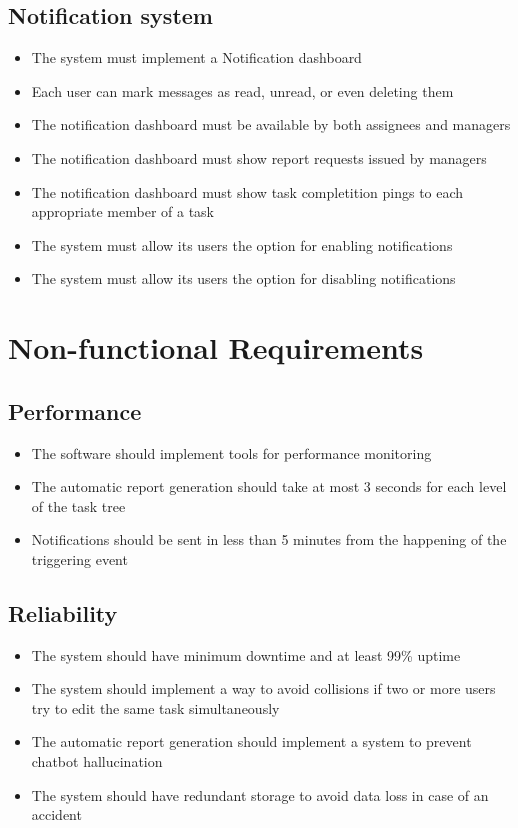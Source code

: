 \documentclass{article}
\begin{document}
\subsection{Notification system}
\begin{itemize}
    \item The system must implement a Notification dashboard
    \item Each user can mark messages as read, unread, or even deleting them
    \item The notification dashboard must be available by both assignees and managers
    \item The notification dashboard must show report requests issued by managers
    \item The notification dashboard must show task completition pings to each appropriate member of a task
    \item The system must allow its users the option for enabling notifications
    \item The system must allow its users the option for disabling notifications
\end{itemize}

\section{Non-functional Requirements}
\subsection{Performance}
\begin{itemize}
    \item The software should implement tools for performance monitoring
    \item The automatic report generation should take at most 3 seconds for each level of the task tree
    \item Notifications should be sent in less than 5 minutes from the happening of the triggering event
\end{itemize}

\subsection{Reliability}
\begin{itemize}
    \item The system should have minimum downtime and at least 99\% uptime
    \item The system should implement a way to avoid collisions if two or more users try to edit the same task simultaneously
    \item The automatic report generation should implement a system to prevent chatbot hallucination
    \item The system should have redundant storage to avoid data loss in case of an accident
\end{itemize}
\end{document}
